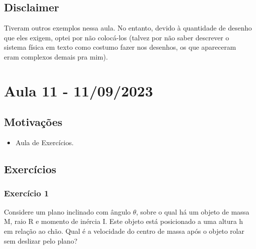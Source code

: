 \documentclass{article}
\begin{document}
\subsection{Disclaimer}
Tiveram outros exemplos nessa aula. No entanto, devido à quantidade de desenho que eles exigem, optei por não colocá-los (talvez por não saber
descrever o sistema física em texto como costumo fazer nos desenhos, os que apareceram eram complexos demais pra mim).
\newpage

\section{Aula 11 - 11/09/2023}
\subsection{Motivações}
\begin{itemize}
  \item Aula de Exercícios.
\end{itemize}
\subsection{Exercícios}
\subsubsection{Exercício 1}
Considere um plano inclinado com ângulo \(\theta \), sobre o qual há um objeto de massa M, raio R e momento de inércia I.
Este objeto está posicionado a uma altura h em relação ao chão. Qual é a velocidade do centro de massa após o objeto rolar sem deslizar pelo plano?
\end{document}
